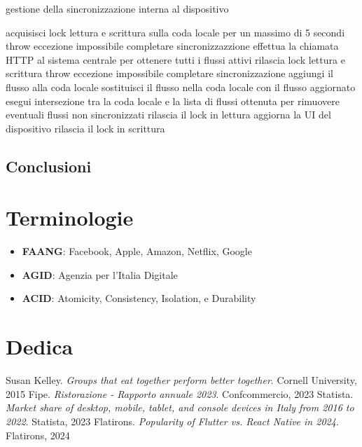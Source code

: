\documentclass[a4paper, titlepage, 12pt, openright, twoside]{book}
\begin{document}
\begin{algorithm}
\caption{gestione della sincronizzazione interna al dispositivo}
\begin{algorithmic}[1]
\State acquisisci lock lettura e scrittura sulla coda locale per un massimo di 5 secondi
\State throw eccezione impossibile completare sincronizzazzione
\EndIf
\State effettua la chiamata HTTP al sistema centrale per ottenere tutti i flussi attivi
	\State rilascia lock lettura e scrittura
	\State throw eccezione impossibile completare sincronizzazione
\EndIf
{}
		\State aggiungi il flusso alla coda locale
		\State sostituisci il flusso nella coda locale con il flusso aggiornato
	\EndIf
\EndFor
\State esegui intersezione tra la coda locale e la lista di flussi ottenuta per rimuovere eventuali flussi non sincronizzati
\State rilascia il lock in lettura
\State aggiorna la UI del dispositivo
\State rilascia il lock in scrittura
\end{algorithmic}
\end{algorithm}

\section{Conclusioni}

\chapter{Terminologie}\label{chap:terminologie}

\begin{itemize}
	\item \textbf{FAANG}: Facebook, Apple, Amazon, Netflix, Google
	\item \textbf{AGID}: Agenzia per l'Italia Digitale
	\item \textbf{ACID}: Atomicity, Consistency, Isolation, e Durability
\end{itemize}

\chapter{Dedica}\label{chap:dedica}

\begin{thebibliography}{9}
	 Susan Kelley. \textsl{Groups that eat together perform better together}. Cornell University, 2015
	 Fipe. \textsl{Ristorazione - Rapporto annuale 2023}. Confcommercio, 2023
	 Statista. \textsl{Market share of desktop, mobile, tablet, and console devices in Italy from 2016 to 2022}. Statista, 2023
	 Flatirons. \textsl{Popularity of Flutter vs. React Native in 2024}. Flatirons, 2024
\end{thebibliography}
\end{document}
